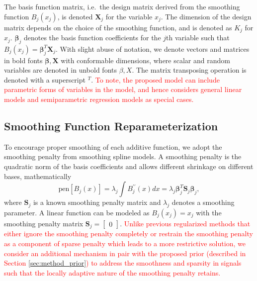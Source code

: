 \documentclass[AMA,STIX1COL,]{WileyNJD-v2}
\begin{document}
The basis function matrix, i.e.~the design matrix derived from the
smoothing function \(B_j(x_j)\), is denoted \(\boldsymbol{X}_j\) for the
variable \(x_j\). The dimension of the design matrix depends on the
choice of the smoothing function, and is denoted as \(K_j\) for \(x_j\).
\(\boldsymbol{\beta}_j\) denotes the basis function coefficients for the
\(j\)th variable such that
\(B_j(x_j) = \boldsymbol{\beta}_j^T \boldsymbol{X}_j\). With slight
abuse of notation, we denote vectors and matrices in bold fonts
\(\boldsymbol{\beta}, \boldsymbol{X}\) with conformable dimensions,
where scalar and random variables are denoted in unbold fonts
\(\beta, X\). The matrix transposing operation is denoted with a
superscript \(^T\).
\textcolor{red}{To note, the proposed model can include parametric forms of variables in the model, and hence considers general linear models and semiparametric regression models as special cases.}

\subsection{Smoothing Function Reparameterization}

To encourage proper smoothing of each additive function, we adopt the
smoothing penalty from smoothing spline models\citep{Wood2017}. A
smoothing penalty is the quadratic norm of the basis coefficients and
allows different shrinkage on different bases, mathematically
\begin{equation}
  \text{pen}\left[B_j(x)\right] = \lambda_j \int B^{\prime\prime}_j(x)dx = \lambda_j \boldsymbol{\beta}_j^T \boldsymbol{S}_j \boldsymbol{\beta}_j ,\nonumber
\end{equation} where \(\boldsymbol{S}_j\) is a known smoothing penalty
matrix and \(\lambda_j\) denotes a smoothing parameter. A linear
function can be modeled as \(B_j(x_j) = x_j\) with the smoothing penalty
matrix \(\boldsymbol{S}_j = \begin{bmatrix}0\end{bmatrix}\).
\textcolor{red}{Unlike previous regularized methods that either ignore the smoothing penalty completely or restrain the smoothing penalty as a component of sparse penalty which leads to a more restrictive solution, we consider an additional mechanism in pair with the proposed prior (described in Section \ref{sec:method_prior}) to address the smoothness and sparsity in signals such that the locally adaptive nature of the smoothing penalty retains.}
\end{document}

